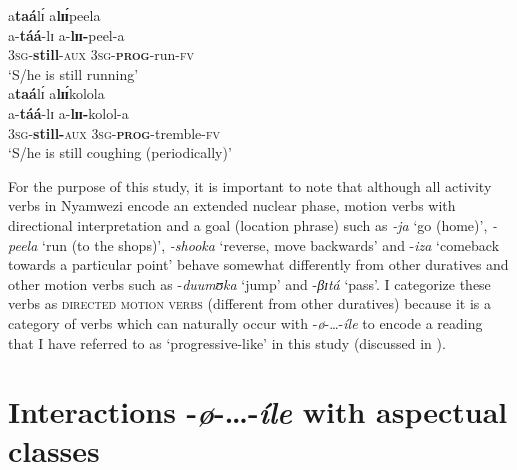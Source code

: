 \documentclass[output=paper,newtxmath,modfonts,nonflat,draftmode]{langsci/langscibook}
\begin{document}
\ea \label{ex:kanijo:14}
\ea \label{ex:kanijo:14a}
\glll a\textbf{taá}lɪ́ a\textbf{lɪɪ́}peela\\ 
a-\textbf{táá}-lɪ  a-\textbf{lɪɪ}\textbf{-}peel-a\\
\textsc{3sg}-\textbf{still}-\textsc{aux} \textsc{3sg}-\textbf{\textsc{prog}}-run-\textsc{fv}\\ 
\glt ‘S/he is still running’\\
\ex \label{ex:kanijo:14b}
\glll a\textbf{taá}lɪ́      a\textbf{l}\textbf{ɪɪ́}kolola\\
a-\textbf{táá}-lɪ            a-\textbf{lɪɪ-}kolol-a\\  
\textsc{3sg}-\textbf{still-}\textsc{aux} \textsc{3sg}-\textbf{\textsc{prog}}-tremble-\textsc{fv}\\
\glt ‘S/he is still coughing (periodically)’\\  
\z
\z

For the purpose of this study, it is important to note that although all activity verbs in Nyamwezi encode an extended nuclear phase, motion verbs with directional interpretation and a goal (location phrase) such as \textit{-ja} ‘go (home)’, \textit{-peela} ‘run (to the shops)’, \textit{-shooka} ‘reverse, move backwards’ and -\textit{iza} ‘comeback towards a particular point’ behave somewhat differently from other duratives and other motion verbs such as -\textit{duumʊ}\textit{ka} ‘jump’ and -\textit{βɪ}\textit{tá} ‘pass’. I categorize these verbs as \textsc{directed motion verbs} (different from other duratives) because it is a category of verbs which can naturally occur with -\textit{ø}-…-\textit{íle} to encode a reading that I have referred to as ‘progressive-like’ in this study (discussed in ).

\section{Interactions -\textit{ø}-…-\textit{íle} with aspectual classes}\label{sec:kanijo:4}
\end{document}
